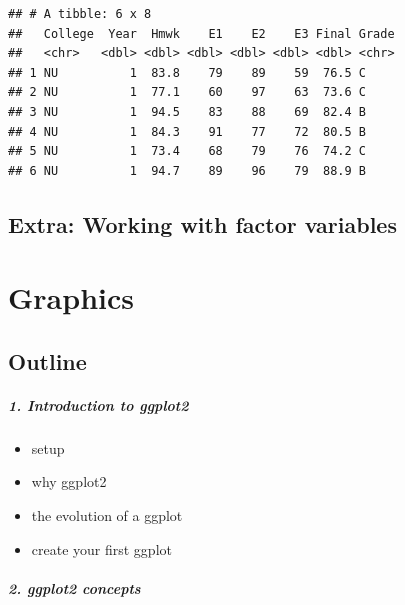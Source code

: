 \documentclass[
]{book}
\providecommand{\tightlist}{%
  \setlength{\itemsep}{0pt}\setlength{\parskip}{0pt}}
\begin{document}
\begin{verbatim}
## # A tibble: 6 x 8
##   College  Year  Hmwk    E1    E2    E3 Final Grade
##   <chr>   <dbl> <dbl> <dbl> <dbl> <dbl> <dbl> <chr>
## 1 NU          1  83.8    79    89    59  76.5 C    
## 2 NU          1  77.1    60    97    63  73.6 C    
## 3 NU          1  94.5    83    88    69  82.4 B    
## 4 NU          1  84.3    91    77    72  80.5 B    
## 5 NU          1  73.4    68    79    76  74.2 C    
## 6 NU          1  94.7    89    96    79  88.9 B
\end{verbatim}

\hypertarget{extra-working-with-factor-variables}{%
\section{Extra: Working with factor variables}\label{extra-working-with-factor-variables}}

\hypertarget{graphics}{%
\chapter{Graphics}\label{graphics}}

\hypertarget{outline}{%
\section*{Outline}\label{outline}}

\hypertarget{introduction-to-ggplot2}{%
\paragraph*{1. Introduction to ggplot2}\label{introduction-to-ggplot2}}

\begin{itemize}
\tightlist
\item
  setup
\item
  why ggplot2
\item
  the evolution of a ggplot
\item
  create your first ggplot
\end{itemize}

\hypertarget{ggplot2-concepts}{%
\paragraph*{2. ggplot2 concepts}\label{ggplot2-concepts}}
\end{document}
